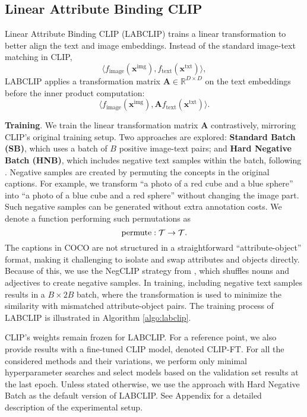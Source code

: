 \subsection{Linear Attribute Binding CLIP}


Linear Attribute Binding CLIP (LABCLIP) trains a linear transformation to better align the text and image embeddings. Instead of the standard image-text matching in CLIP, 
$$\langle f_{\text{image}}(\mathbf{x}^{\text{img}}), f_{\text{text}}(\mathbf{x}^{\text{txt}}) \rangle,$$
LABCLIP applies a transformation matrix \( \mathbf{A} \in \mathbb{R}^{D \times D} \) on the text embeddings before the inner product computation:
$$\langle f_{\text{image}}(\mathbf{x}^{\text{img}}), \mathbf{A} f_{\text{text}}(\mathbf{x}^{\text{txt}}) \rangle.$$

\noindent
\textbf{Training}. We train the linear transformation matrix $ \mathbf{A}$ contrastively, mirroring CLIP’s original training setup. Two approaches are explored: \textbf{Standard Batch (SB)}, which uses a batch of \( B \) positive image-text pairs; and \textbf{Hard Negative Batch (HNB)}, which includes negative text samples within the batch, following \cite{Yuksekgonul2023}. Negative samples are created by permuting the concepts in the original captions. For example, we transform ``a photo of a red cube and a blue sphere'' into ``a photo of a blue cube and a red sphere'' without changing the image part. Such negative samples can be generated without extra annotation costs. We denote a function performing such permutations as 
$$\text{permute} : \mathcal{T} \rightarrow \mathcal{T}.$$
The captions in COCO are not structured in a straightforward ``attribute-object'' format, making it challenging to isolate and swap attributes and objects directly. Because of this, we use the NegCLIP strategy from \cite{Yuksekgonul2023}, which shuffles nouns and adjectives to create negative samples.
In training, including negative text samples results in a \( B \times 2B \) batch, where the transformation is used to minimize the similarity with mismatched attribute-object pairs. The training process of LABCLIP is illustrated in Algorithm \ref{algo:labclip}.

CLIP’s weights remain frozen for LABCLIP. For a reference point, we also provide results with a fine-tuned CLIP model, denoted CLIP-FT. For all the considered methods and their variations, we perform only minimal hyperparameter searches and select models based on the validation set results at the last epoch. Unless stated otherwise, we use the approach with Hard Negative Batch as the default version of LABCLIP. See Appendix for a detailed description of the experimental setup.






